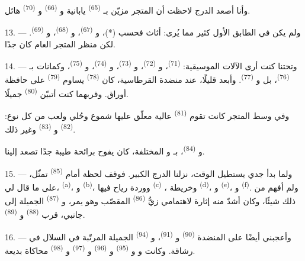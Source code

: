 وأنا أصعد الدرج لاحظت أن المتجر مزيّن بـ \textsuperscript{(65)}
يابانية و \textsuperscript{(66)} و \textsuperscript{(70)}
هائل.

13. --- ولم يكن في الطابق الأول كثير مما يُرى: أثاث فحسب (*)،
و \textsuperscript{(67)}، و
\textsuperscript{(68)}، و \textsuperscript{(69)}. لكن منظر المتجر
العام كان  جدًا.

14. --- وتحتنا كنت أرى الآلات الموسيقية:  \textsuperscript{(71)}،
و \textsuperscript{(72)}، و \textsuperscript{(73)}،
و \textsuperscript{(74)}، و \textsuperscript{(75)}،
وكمانات بـ \textsuperscript{(76)}، بل و
\textsuperscript{(77)}. وأبعد قليلًا، عند منضدة القرطاسية، كان 
\textsuperscript{(78)} يساوم  \textsuperscript{(79)} على حافظة أوراق.
وقربهما كنت أتبيّن  \textsuperscript{(80)} جميلًا.

وفي وسط المتجر كانت تقوم  \textsuperscript{(81)} عالية
معلّق عليها شموع وحُلي ولعب من كل نوع:  \textsuperscript{(82)}
و \textsuperscript{(83)} وغير ذلك.

و \textsuperscript{(84)}، بـ
و المختلفة، كان يفوح برائحة طيبة جدًا تصعد إلينا.

\VUsaut{3.4mm}
\VUsaut{2.8mm}

15. --- ولما بدأ جدي يستطيل الوقت، نزلنا الدرج الكبير. فوقف لحظة أمام
 \textsuperscript{(85)} تمثّل، على ما قال لي،
 \textsuperscript{(a)}، و
\textsuperscript{(b)}، ووردة رياح فيها  \textsuperscript{(c)}
، وخريطة 
\textsuperscript{(d)}، و \textsuperscript{(e)}، و \textsuperscript{(f)}. ولم أفهم من ذلك شيئًا، وكان أشدّ منه إثارة
لاهتمامي زيُّ  \textsuperscript{(86)} المقصّب وهو يمر،
و \textsuperscript{(87)} الجميلة إلى جانبي، قرب
 \textsuperscript{(88)} و \textsuperscript{(89)}.

16. --- وأعجبني أيضًا على المنضدة  \textsuperscript{(90)}
و \textsuperscript{(91)}، و
\textsuperscript{(94)} الجميلة المرتّبة في السلال في رشاقة. وكانت
 و و \textsuperscript{(95)}
و \textsuperscript{(96)} و \textsuperscript{(97)}
و \textsuperscript{(98)} محاكاة بديعة.


